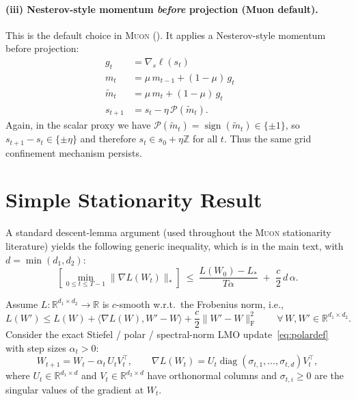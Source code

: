\documentclass{article}
\theoremstyle{plain}
\theoremstyle{definition}
\theoremstyle{remark}
\newcommand{\R}{\mathbb{R}}
\newcommand{\Z}{\mathbb{Z}}
\newcommand{\loss}{L}
\newcommand{\stepsize}{\alpha}
\newcommand{\proj}{\mathcal{P}}
\newcommand{\sign}{\operatorname{sign}}
\newcommand{\diag}{\operatorname{diag}}
\newcommand{\Lips}{{c}} %
\newcommand{\sv}{{s}} %
\newcommand{\svnn}{{\sigma}} %
\newcommand{\Muon}{\textsc{Muon}}
\begin{document}
\paragraph{(iii) Nesterov-style momentum \emph{before} projection (Muon default).}
This is the default choice in \Muon{} (). 
It applies a Nesterov-style momentum before projection:
\begin{equation}
\begin{aligned}
  g_t &= \nabla_\sv \ell(\sv_t) \\
  m_t &= \mu\, m_{t-1} + (1-\mu)\,g_t \\
  \tilde m_t &= \mu\, m_t + (1-\mu)\,g_t \\
  \sv_{t+1} &= \sv_t - \eta\,\proj(\tilde m_t). &&
\end{aligned}
  \label{eq:muon-nesterov}
\end{equation}
Again, in the scalar proxy we have $\proj(\tilde m_t)=\sign(\tilde m_t)\in\{\pm 1\}$, so $\sv_{t+1}-\sv_t\in\{\pm\eta\}$ and therefore $\sv_t\in \sv_0+\eta\Z$ for all $t$.
Thus the same grid confinement mechanism persists. 

\section{Simple Stationarity Result}
\label{app:stationarity}

A standard descent-lemma argument (used throughout the \Muon{} stationarity literature) yields the following generic inequality, which is  in the main text, with $d=\min(d_1,d_2)$:
\begin{equation}
  \left[ \min_{0\le t\le T-1}\|\nabla \loss(W_t)\|_\ast \right]
  \ \le\
  \frac{\loss(W_0)-\loss_\ast}{T\stepsize}
  \;+\;
  \frac{\Lips}{2}\,d\,\stepsize.
  \label{eq-app:stationarity-constant}
\end{equation}

Assume $\loss \colon \R^{d_1\times d_2}\to\R$ is $\Lips$-smooth w.r.t.\ the Frobenius norm, i.e.,
\[
\loss(W') \le \loss(W) + \langle \nabla\loss(W), W'-W\rangle + \frac{\Lips}{2}\|W'-W\|_{\mathrm{F}}^2
\qquad \forall\,W,W'\in\R^{d_1\times d_2}.
\]
Consider the exact Stiefel / polar / spectral-norm LMO update~\eqref{eq:polardef} with step sizes $\stepsize_t>0$:
\begin{equation}
  W_{t+1}=W_t-\stepsize_t\,U_t^{}V_t^\top,
  \qquad
  \nabla \loss(W_t)=U_t\diag(\svnn_{t,1}, \ldots, \svnn_{t,d})V_t^\top,
  \label{eq:lmo-update}
\end{equation}
where $U_t\in\R^{d_1\times d}$ and $V_t\in\R^{d_2\times d}$ have orthonormal columns and $\svnn_{t,i} \geq 0$ are the singular values of the gradient at $W_t$. 
\end{document}
